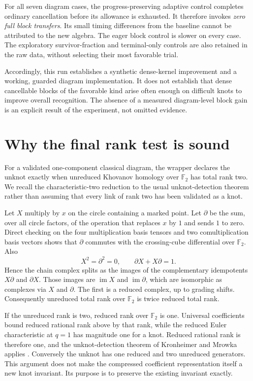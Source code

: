 \documentclass[11pt]{article}
\theoremstyle{definition}\newtheorem{definition}[theorem]{Definition}
\theoremstyle{remark}\newtheorem{remark}[theorem]{Remark}
\newcommand{\F}{{\mathbb F_2}}
\newcommand{\im}{\operatorname{im}}
\begin{document}


For all seven diagram cases, the progress-preserving adaptive control completes
ordinary cancellation before its allowance is exhausted. It therefore invokes
\emph{zero full block transfers}. Its small timing differences from the baseline
cannot be attributed to the new algebra. The eager block control is slower on
every case. The exploratory survivor-fraction and terminal-only controls are
also retained in the raw data, without selecting their most favorable trial.

Accordingly, this run establishes a synthetic dense-kernel improvement and a
working, guarded diagram implementation. It does not establish that dense
cancellable blocks of the favorable kind arise often enough on difficult knots
to improve overall recognition. The absence of a measured diagram-level block
gain is an explicit result of the experiment, not omitted evidence.

\section{Why the final rank test is sound}
\label{sec:detector}
For a validated one-component classical diagram, the wrapper declares the unknot
exactly when unreduced Khovanov homology over $\F$ has total rank two. We recall
the characteristic-two reduction to the usual unknot-detection theorem rather
than assuming that every link of rank two has been validated as a knot.

Let $X$ multiply by $x$ on the circle containing a marked point. Let $\partial$
be the sum, over all circle factors, of the operation that replaces $x$ by $1$
and sends $1$ to zero. Direct checking on the four multiplication basis tensors
and two comultiplication basis vectors shows that $\partial$ commutes with the
crossing-cube differential over $\F$. Also
\[
 X^2=\partial^2=0,\qquad \partial X+X\partial=1.
\]
Hence the chain complex splits as the images of the complementary idempotents
$X\partial$ and $\partial X$. Those images are $\im X$ and $\im\partial$,
which are isomorphic as complexes via $X$ and $\partial$. The first is a reduced
complex, up to grading shifts. Consequently unreduced total rank over $\F$ is
twice reduced total rank.

If the unreduced rank is two, reduced rank over $\F$ is one. Universal coefficients
bound reduced rational rank above by that rank, while the reduced Euler
characteristic at $q=1$ has magnitude one for a knot. Reduced rational rank is
therefore one, and the unknot-detection theorem of Kronheimer and Mrowka applies
\cite{KM2011}. Conversely the unknot has one reduced and two unreduced generators.
This argument does not make the compressed coefficient representation itself a
new knot invariant. Its purpose is to preserve the existing invariant exactly.
\end{document}
